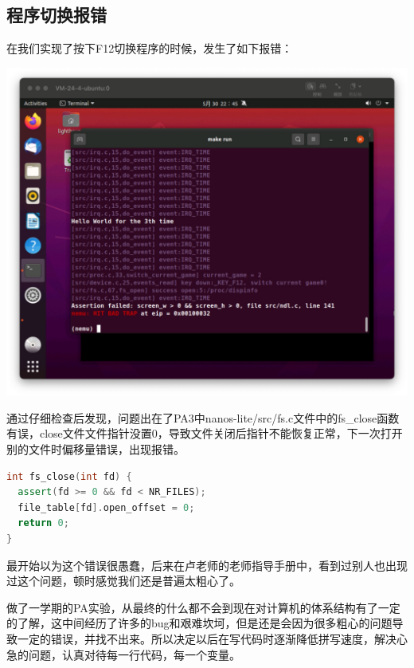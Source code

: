 \documentclass[UTF8,a4paper,10pt]{ctexart}
\begin{document}
\subsection{程序切换报错}
在我们实现了按下F12切换程序的时候，发生了如下报错：
\begin{center}
  \includegraphics*[scale= 0.2]{img/报错4}
\end{center}
通过仔细检查后发现，问题出在了PA3中nanos-lite/src/fs.c文件中的fs\_close函数有误，close文件文件指针没置0，导致文件关闭后指针不能恢复正常，下一次打开别的文件时偏移量错误，出现报错。
\begin{lstlisting}[language = C++]
int fs_close(int fd) {
  assert(fd >= 0 && fd < NR_FILES);
  file_table[fd].open_offset = 0;
  return 0;
}
\end{lstlisting}
最开始以为这个错误很愚蠢，后来在卢老师的老师指导手册中，看到过别人也出现过这个问题，顿时感觉我们还是普遍太粗心了。

做了一学期的PA实验，从最终的什么都不会到现在对计算机的体系结构有了一定的了解，这中间经历了许多的bug和艰难坎坷，但是还是会因为很多粗心的问题导致一定的错误，并找不出来。所以决定以后在写代码时逐渐降低拼写速度，解决心急的问题，认真对待每一行代码，每一个变量。
\end{document}
